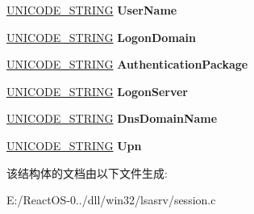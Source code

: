 \begin{DoxyCompactItemize}
\hyperlink{struct___u_n_i_c_o_d_e___s_t_r_i_n_g}{U\+N\+I\+C\+O\+D\+E\+\_\+\+S\+T\+R\+I\+NG} {\bfseries User\+Name}
\item 
\mbox{\label{struct___l_s_a_p___l_o_g_o_n___s_e_s_s_i_o_n_a84f8b6ab8f28e505e3ef7336cc9fc81d}} 
\hyperlink{struct___u_n_i_c_o_d_e___s_t_r_i_n_g}{U\+N\+I\+C\+O\+D\+E\+\_\+\+S\+T\+R\+I\+NG} {\bfseries Logon\+Domain}
\item 
\mbox{\label{struct___l_s_a_p___l_o_g_o_n___s_e_s_s_i_o_n_aa51c88dce4109282522223bb76ced129}} 
\hyperlink{struct___u_n_i_c_o_d_e___s_t_r_i_n_g}{U\+N\+I\+C\+O\+D\+E\+\_\+\+S\+T\+R\+I\+NG} {\bfseries Authentication\+Package}
\item 
\mbox{\label{struct___l_s_a_p___l_o_g_o_n___s_e_s_s_i_o_n_a290d88afdc7900008370fb50dde2f962}} 
\hyperlink{struct___u_n_i_c_o_d_e___s_t_r_i_n_g}{U\+N\+I\+C\+O\+D\+E\+\_\+\+S\+T\+R\+I\+NG} {\bfseries Logon\+Server}
\item 
\mbox{\label{struct___l_s_a_p___l_o_g_o_n___s_e_s_s_i_o_n_a2b5782e2396301e41ebadec6cb1616dc}} 
\hyperlink{struct___u_n_i_c_o_d_e___s_t_r_i_n_g}{U\+N\+I\+C\+O\+D\+E\+\_\+\+S\+T\+R\+I\+NG} {\bfseries Dns\+Domain\+Name}
\item 
\mbox{\label{struct___l_s_a_p___l_o_g_o_n___s_e_s_s_i_o_n_aff3281934ed7bba29386ebd31e4375c4}} 
\hyperlink{struct___u_n_i_c_o_d_e___s_t_r_i_n_g}{U\+N\+I\+C\+O\+D\+E\+\_\+\+S\+T\+R\+I\+NG} {\bfseries Upn}
\end{DoxyCompactItemize}


该结构体的文档由以下文件生成\+:\begin{DoxyCompactItemize}
\item 
E\+:/\+React\+O\+S-\/0../dll/win32/lsasrv/session.\+c\end{DoxyCompactItemize}
